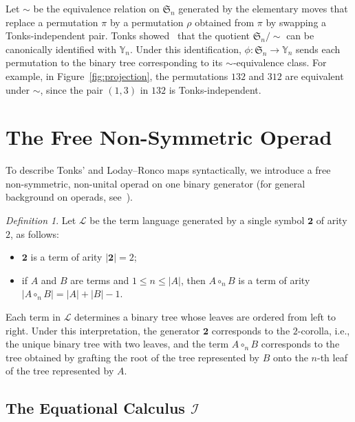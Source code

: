 \documentclass[a4paper]{article}
\theoremstyle{plain}
\theoremstyle{definition}
\theoremstyle{remark}
\numberwithin{equation}{section}
\renewcommand{\le}{\leqslant}\renewcommand{\ge}{\geqslant}
\newcommand{\Sym}{\mathfrak{S}}
\newcommand{\Y}{\mathbb{Y}}
\newtheorem{definition}[theorem]{Definition}
\begin{document}
Let \(\sim\) be the equivalence relation on \(\Sym_n\) generated by the
elementary moves that replace a permutation \(\pi\) by a permutation \(\rho\)
obtained from \(\pi\) by swapping a Tonks-independent pair. Tonks showed~\cite{Ton} that the
quotient \(\Sym_n/\!\sim\) can be canonically identified with \(\Y_n\). Under
this identification, \(\phi:\Sym_n\to\Y_n\) sends each permutation to the binary
tree corresponding to its \(\sim\)-equivalence class. For example, in
Figure~\ref{fig:projection}, the permutations \(132\) and \(312\) are
equivalent under \(\sim\), since the pair \((1,3)\) in \(132\) is
Tonks-independent.

\section{The Free Non-Symmetric Operad}

To describe Tonks' and Loday--Ronco maps syntactically, we introduce a free non-symmetric, non-unital operad on one binary generator (for general background on operads, see~\cite{LoV}).

\begin{definition}
Let \(\mathcal L\) be the term language generated by a single symbol \(\mathbf 2\) of arity \(2\), as follows:
\begin{itemize}
    \item [$\cdot$] \(\mathbf 2\) is a term of arity $|\mathbf{2}|=2$;
    \item [$\cdot$] if \(A\) and \(B\) are terms and \(1\le n\le |A|\), then \(A\circ_n B\) is a term of arity $|A\circ_n B|=|A|+|B|-1$.
\end{itemize}
\end{definition}

Each term in \(\mathcal L\) determines a binary tree whose leaves are ordered from left to right. Under this interpretation, the generator \(\mathbf 2\) corresponds to the \(2\)-corolla, i.e., the unique binary tree with two leaves, and the term \(A\circ_n B\) corresponds to the tree obtained by grafting the root of the tree represented by \(B\) onto the \(n\)-th leaf of the tree represented by \(A\).

\subsection{The Equational Calculus \(\mathcal I\)}
\end{document}

